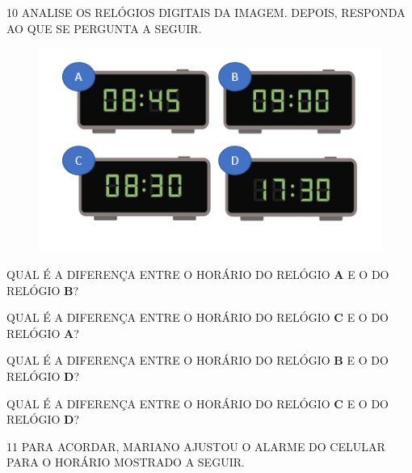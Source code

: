 \num{10} ANALISE OS RELÓGIOS DIGITAIS DA IMAGEM. DEPOIS, RESPONDA AO QUE SE PERGUNTA A SEGUIR.


\begin{figure}[htpb!]
\centering
\includegraphics[width=.5\textwidth]{media/image38.png}
\end{figure}

\begin{escolha}
\item QUAL É A DIFERENÇA ENTRE O HORÁRIO DO RELÓGIO \textbf{A} E O DO RELÓGIO \textbf{B}?


\item QUAL É A DIFERENÇA ENTRE O HORÁRIO DO RELÓGIO \textbf{C} E O DO RELÓGIO \textbf{A}?


\item QUAL É A DIFERENÇA ENTRE O HORÁRIO DO RELÓGIO \textbf{B} E O DO RELÓGIO \textbf{D}?


\item QUAL É A DIFERENÇA ENTRE O HORÁRIO DO RELÓGIO \textbf{C} E O DO RELÓGIO \textbf{D}?

\end{escolha}


\num{11} PARA ACORDAR, MARIANO AJUSTOU O ALARME DO CELULAR PARA O HORÁRIO MOSTRADO A SEGUIR.\bigskip


